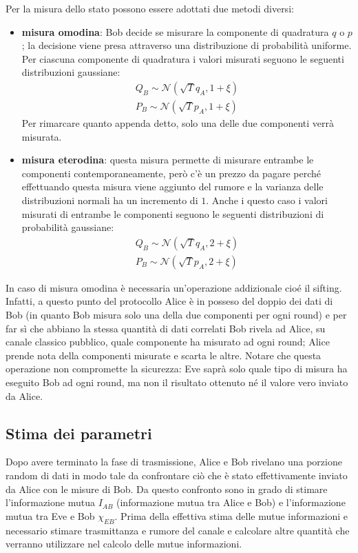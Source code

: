 Per la misura dello stato possono essere adottati due metodi diversi:
\begin{itemize}
\item \textbf{misura omodina}: Bob decide se misurare la componente di quadratura $q$ o $p$; la decisione viene presa attraverso una distribuzione di probabilit\`a uniforme. Per ciascuna componente di quadratura i valori misurati seguono le seguenti distribuzioni gaussiane:
\begin{equation}
\begin{split}
Q_B \sim \mathcal N(\sqrt{T}q_A, 1 + \xi) \\
P_B \sim \mathcal N(\sqrt{T}p_A, 1 + \xi)
\end{split}
\end{equation}
Per rimarcare quanto appenda detto, solo una delle due componenti verr\`a misurata.
\item \textbf{misura eterodina}: questa misura permette di misurare entrambe le componenti contemporaneamente, per\`o c'\`e un prezzo da pagare perch\'e effettuando questa misura viene aggiunto del rumore e la varianza delle distribuzioni normali ha un incremento di $1$. Anche i questo caso i valori misurati di entrambe le componenti seguono le seguenti distribuzioni di probabilit\`a gaussiane:
\begin{equation}
\begin{split}
Q_B \sim \mathcal N(\sqrt{T}q_A, 2 + \xi) \\
P_B \sim \mathcal N(\sqrt{T}p_A, 2 + \xi)
\end{split}
\end{equation}
\end{itemize}  

In caso di misura omodina \`e necessaria un'operazione addizionale cio\'e il sifting. Infatti, a questo punto del protocollo Alice \`e in posseso del doppio dei dati di Bob (in quanto Bob misura solo una della due componenti per ogni round) e per far s\`i che abbiano la stessa quantit\`a di dati correlati Bob rivela ad Alice, su canale classico pubblico, quale componente ha misurato ad ogni round; Alice prende nota della componenti misurate e scarta le altre\cite{milicevic_key_2018}. Notare che questa operazione non compromette la sicurezza: Eve saprà solo quale tipo di misura ha eseguito Bob ad ogni round, ma non il risultato ottenuto né il valore  vero inviato da Alice.

\subsection{Stima dei parametri}\label{subse:stima-parametri}
Dopo avere terminato la fase di trasmissione, Alice e Bob rivelano una porzione random di dati in modo tale da confrontare ci\`o che \`e stato effettivamente inviato da Alice con le misure di Bob. Da questo confronto sono in grado di stimare l'informazione mutua $I_{AB}$ (informazione mutua tra Alice e Bob) e l'informazione mutua tra Eve e Bob $\chi_{EB}$. Prima della effettiva stima delle mutue informazioni e necessario stimare trasmittanza e rumore del canale e calcolare altre quantit\`a che verranno utilizzare nel calcolo delle mutue informazioni.

